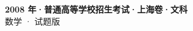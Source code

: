 \documentclass[zihao=-4, a4paper]{ctexart}
\begin{document}
\begin{center}
  {\Large\bfseries 2008 年·普通高等学校招生考试·上海卷·文科}\\[4pt]
  {\large 数学 · 试题版}
\end{center}
\medskip
{}

\end{document}
